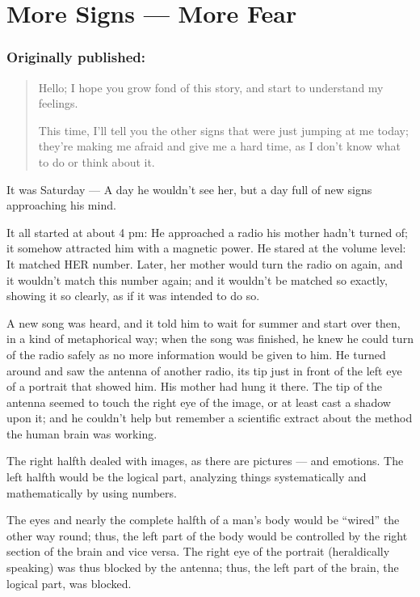 \chapter{More Signs --- More Fear}
\label{cha:more-signs-more-fear}
\subsection*{Originally published: }
\begin{quote}
Hello; I hope you grow fond of this story, and start to understand my feelings. 

This time, I'll tell you the other signs that were just jumping at me today; they're making me afraid and give me a hard time, as I don't know what to do or think about it. 
\end{quote}

It was Saturday --- A day he wouldn't see her, but a day full of new signs approaching his mind.

It all started at about 4 pm: He approached a radio his mother hadn't turned of; it somehow attracted him with a magnetic power. He stared at the volume level: It matched HER number. Later, her mother would turn the radio on again, and it wouldn't match this number again; and it wouldn't be matched so exactly, showing it so clearly, as if it was intended to do so.

A new song was heard, and it told him to wait for summer and start over then, in a kind of metaphorical way; when the song was finished, he knew he could turn of the radio safely as no more information would be given to him. He turned around and saw the antenna of another radio, its tip just in front of the left eye of a portrait that showed him. His mother had hung it there. The tip of the antenna seemed to touch the right eye of the image, or at least cast a shadow upon it; and he couldn't help but remember a scientific extract about the method the human brain was working.

The right halfth dealed with images, as there are pictures --- and emotions.
The left halfth would be the logical part, analyzing things systematically and mathematically by using numbers.

The eyes and nearly the complete halfth of a man's body would be \enquote{wired} the other way round; thus, the left part of the body would be controlled by the right section of the brain and vice versa. 
The right eye of the portrait (heraldically speaking) was thus blocked by the antenna; thus, the left part of the brain, the logical part, was blocked.

